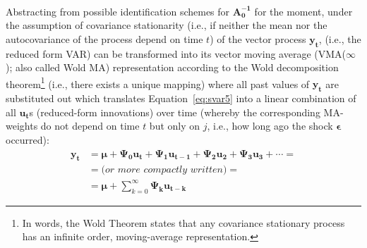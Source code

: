 \documentclass[a4paper,11pt,listof=nochaptergap,oneside,pointednumbers,bibtotoc,bigheadings,liststotoc]{scrbook}
\theoremstyle{mysatz}
\theoremstyle{mydefinition}
\theoremstyle{mybemerkung}
\newcommand{\vect}[1]{\boldsymbol{\mathbf{#1}}}
\begin{document}
\\
Abstracting from possible identification schemes for $\vect{A_0^{-1}}$ for the moment, under the assumption of covariance stationarity (i.e., if neither the mean nor the autocovariance of the process depend on time $t$) of the vector process $\vect{y_t}$, \vect{y_t} (i.e., the reduced form VAR) can be transformed into its vector moving average (VMA($\infty$); also called Wold MA) representation according to the Wold decomposition theorem\footnote{In words, the Wold Theorem states that any covariance stationary process has an infinite order, moving-average representation.} (i.e., there exists a unique mapping) where all past values of $\vect{y_t}$ are substituted out which translates Equation~\ref{eq:svar5} into a linear combination of all $\vect{u_t}$s (reduced-form innovations) over time (whereby the corresponding MA-weights do not depend on time $t$ but only on $j$, i.e., how long ago the shock $\vect{\epsilon}$ occurred):
\begin{equation} \label{eq:svar7}
\begin{split}
 			\vect{y_t} & = \vect{\mu} + \vect{\Psi_0}\vect{u_t} + \vect{\Psi_1}\vect{u_{t-1}} + \vect{\Psi_{2}}\vect{u_2} + \vect{\Psi_{3}}\vect{u_3} + \cdots = \\
			& = \textit{(or more compactly written)} = \\
			& = \vect{\mu} + \sum\limits_{k=0}^\infty \vect{\Psi_k}\vect{u_{t-k}}
\end{split}								
\end{equation}
\end{document}
